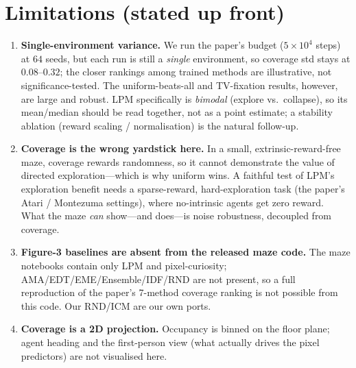 \documentclass[11pt]{article}
\begin{document}
\section{Limitations (stated up front)}
\begin{enumerate}[leftmargin=1.6em]
  \item \textbf{Single-environment variance.} We run the paper's budget ($5\times10^{4}$ steps) at
  $64$ seeds, but each run is still a \emph{single} environment, so coverage std stays at
  $0.08$--$0.32$; the closer rankings among trained methods are illustrative, not significance-tested.
  The uniform-beats-all and TV-fixation results, however, are large and robust. LPM specifically is
  \emph{bimodal} (explore vs.\ collapse), so its mean/median should be read together, not as a point
  estimate; a stability ablation (reward scaling / normalisation) is the natural follow-up.
  \item \textbf{Coverage is the wrong yardstick here.} In a small, extrinsic-reward-free maze,
  coverage rewards randomness, so it cannot demonstrate the value of directed exploration---which is
  why uniform wins. A faithful test of LPM's exploration benefit needs a sparse-reward,
  hard-exploration task (the paper's Atari / Montezuma settings), where no-intrinsic agents get zero
  reward. What the maze \emph{can} show---and does---is noise robustness, decoupled from coverage.
  \item \textbf{Figure-3 baselines are absent from the released maze code.} The maze notebooks contain
  only LPM and pixel-curiosity; AMA/EDT/EME/Ensemble/IDF/RND are not present, so a full reproduction of
  the paper's 7-method coverage ranking is not possible from this code. Our RND/ICM are our own ports.
  \item \textbf{Coverage is a 2D projection.} Occupancy is binned on the floor plane; agent heading
  and the first-person view (what actually drives the pixel predictors) are not visualised here.
\end{enumerate}
\end{document}
